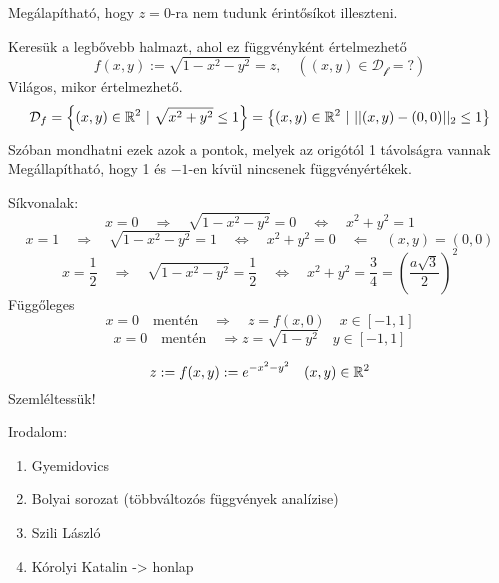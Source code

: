 \documentclass[a4paper,11.5pt]{article}
\begin{document}
	\begin{note}
		Megálapítható, hogy $z=0$-ra nem tudunk érintősíkot illeszteni.
	\end{note}
	\begin{task}Keresük a legbővebb halmazt, ahol ez függvényként értelmezhető
		\[ f(x,y):=\sqrt{1-x^2-y^2}=z,\quad ((x,y)\in\mathcal{D_f}=?) \]
		Világos, mikor értelmezhető.
		\[ \mathcal{D}_f=\left\{(x,y)\in\mathbb{R}^2~|~\sqrt{x^2+y^2}\leq 1 \right\}=\left\{ (x,y)\in\mathbb{R}^2~|~||(x,y)-(0,0)||_2\leq 1 \right\} \]
		Szóban mondhatni ezek azok a pontok, melyek az origótól 1 távolságra vannak
		Megállapítható, hogy 1 és $-1$-en kívül nincsenek függvényértékek.
		\smallskip
		
		Síkvonalak:
		\[ x=0\quad \Rightarrow\quad \sqrt{1-x^2-y^2}=0\quad \Leftrightarrow\quad x^2+y^2=1 \]
		\[ x=1\quad \Rightarrow\quad \sqrt{1-x^2-y^2}=1\quad \Leftrightarrow\quad x^2+y^2=0\quad \Leftarrow\quad (x,y)=(0,0) \]
		\[ x=\frac{1}{2}\quad \Rightarrow\quad \sqrt{1-x^2-y^2}=\frac{1}{2}\quad \Leftrightarrow\quad x^2+y^2=\frac{3}{4}=\left(\frac{a\sqrt{3}}{2}\right)^2\]
		Függőleges
		\[ x=0\quad \text{mentén}\quad \Rightarrow\quad z=f(x,0)\quad x\in[-1,1] \]
		\[ x=0\quad \text{mentén}\quad \Rightarrow z=\sqrt{1-y^2}\quad y\in[-1,1] \]
	\end{task}
	\begin{exercise}
		\[ z:=f(x,y):=e^{-x^2-y^2}\quad (x,y)\in\mathbb{R}^2 \]
		Szemléltessük!
	\end{exercise}
	\begin{note}
		Irodalom:
		\begin{enumerate}
			\item Gyemidovics
			\item Bolyai sorozat (többváltozós függvények analízise)
			\item Szili László
			\item Kórolyi Katalin -> honlap
		\end{enumerate}
	\end{note}
\end{document}
